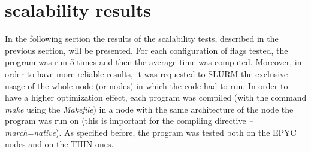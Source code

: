 \documentclass[12pt, titlepage]{report}
\begin{document}
\section{scalability results}\label{Results}
In the following section the results of the scalability tests, described in the previous section, will be presented. 
For each configuration of flags tested, the program was run 5 times and then the average time was computed. 
Moreover, in order to have more reliable results, it was requested to SLURM the exclusive usage of the
whole node (or nodes) in which the code had to run. In order to have a higher optimization effect, each program was compiled (with the command \emph{make}
using the \emph{Makefile}) in a node with the same architecture of the node the program was run on (this is important for the compiling directive 
\emph{--march=native}). As specified before, the program was tested both on the EPYC nodes and on the THIN ones. 
\end{document}

